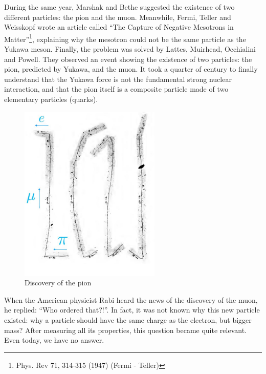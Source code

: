 During the same year, Marshak and Bethe suggested the existence of two different particles: the pion and the muon. Meanwhile, Fermi, Teller and Weisskopf wrote an article called ``The Capture of Negative Mesotrons in Matter''\footnote{Phys. Rev 71, 314-315 (1947) (Fermi - Teller)}, explaining why the mesotron could not be the same particle as the Yukawa meson.
Finally, the problem was solved by Lattes, Muirhead, Occhialini and Powell. They observed an event showing the existence of two particles: the pion, predicted by Yukawa, and the muon.
It took a quarter of century to finally understand that the Yukawa force is not the fundamental strong nuclear interaction, and that the pion itself is a composite particle made of two elementary particles (quarks).

\begin{figure}[!h]
\begin{center}
    \centering
    \includegraphics[width=0.6\textwidth]{Figures/FNSN18_9.JPG}
    \caption{Discovery of the pion}
    \label{fig:pione}
\end{center}
\end{figure}

When the American physicist Rabi heard the news of the discovery of the muon, he replied: ``Who ordered that?!''. In fact, it was not known why this new particle existed: why a particle should have the same charge as the electron, but bigger mass? After measuring all its properties, this question became quite relevant. Even today, we have no answer.


